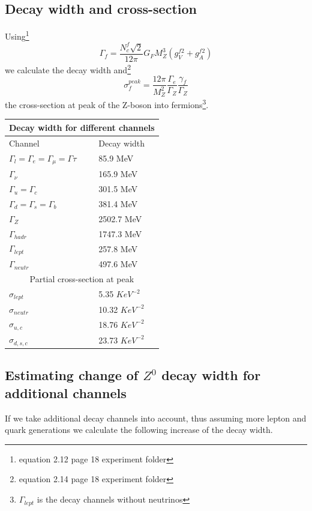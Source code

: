 \documentclass[]{article}
\begin{document}
\subsection{Decay width and cross-section}
Using\footnote{equation 2.12 page 18 experiment folder}
\begin{equation}
\Gamma_f = \frac{N^f_c \sqrt{2}}{12 \pi} G_F M_Z^3(g_V^{f2} + g_A^{f2})
\end{equation}
we calculate the decay width and\footnote{equation 2.14 page 18 experiment folder}
\begin{equation}
\sigma^{peak}_f= \frac{12 \pi}{M_Z^2} \frac{\Gamma_e}{\Gamma_Z}\frac{\gamma_f}{\Gamma_Z}
\end{equation}
the cross-section at peak of the Z-boson into fermions\footnote{$\Gamma_{lept}$ is the decay channels without neutrinos}.

\begin{tabular}{ |p{3cm}||p{3cm}|  }
 \hline
 \multicolumn{2}{|c|}{Decay width for different channels} \\
 \hline
 Channel & Decay width \\
 \hline
  $\Gamma_l = \Gamma_e = \Gamma_{\mu} = \Gamma{\tau} $   & 85.9 MeV   \\
  $\Gamma_{\nu} $   & 165.9 MeV   \\
  $\Gamma_u = \Gamma_c $   & 301.5 MeV   \\
  $\Gamma_d = \Gamma_s = \Gamma_b $   & 381.4 MeV   \\
  \hline
  $\Gamma_Z $   & 2502.7 MeV   \\
  $\Gamma_{hadr} $   & 1747.3 MeV   \\
  $\Gamma_{lept} $   & 257.8  MeV   \\
  $\Gamma_{neutr} $   & 497.6  MeV   \\
 \hline
 \hline
 \multicolumn{2}{|c|}{Partial cross-section at peak} \\
 \hline
  $\sigma_{lept} $   & 5.35 $KeV^{-2}$   \\
  $\sigma_{neutr} $   & 10.32 $KeV^{-2}$   \\
  $\sigma_{u, c} $   & 18.76 $KeV^{-2}$   \\
  $\sigma_{d,s,c} $   & 23.73 $KeV^{-2}$   \\
 \hline
\end{tabular}

\subsection{Estimating change of $Z^0$ decay width for additional channels}
If we take additional decay channels into account, thus assuming more lepton and quark generations we calculate the following increase of the decay width.
\end{document}
